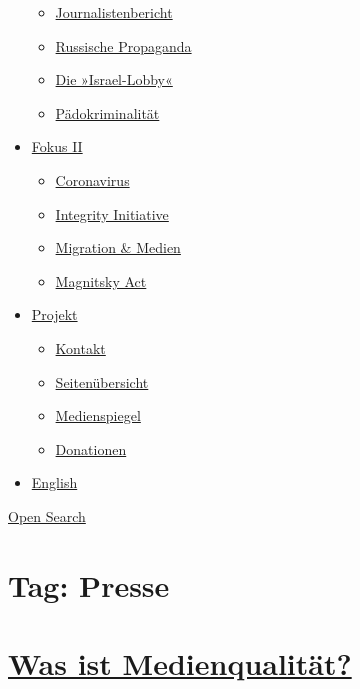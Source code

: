\begin{itemize}
  \begin{itemize}
  \tightlist
  \item
    \href{https://swprs.org/bericht-eines-journalisten/}{Journalistenbericht}
  \item
    \href{https://swprs.org/russische-propaganda/}{Russische Propaganda}
  \item
    \href{https://swprs.org/die-israel-lobby-fakten-und-mythen/}{Die
    »Israel-Lobby«}
  \item
    \href{https://swprs.org/geopolitik-und-paedokriminalitaet/}{Pädokriminalität}
  \end{itemize}
\item
  \href{https://swprs.org/migration-und-medien/}{Fokus II}

  \begin{itemize}
  \tightlist
  \item
    \href{https://swprs.org/covid-19-hinweis-ii/}{Coronavirus}
  \item
    \href{https://swprs.org/die-integrity-initiative/}{Integrity
    Initiative}
  \item
    \href{https://swprs.org/migration-und-medien/}{Migration \& Medien}
  \item
    \href{https://swprs.org/der-fall-magnitsky/}{Magnitsky Act}
  \end{itemize}
\item
  \href{https://swprs.org/kontakt/}{Projekt}

  \begin{itemize}
  \tightlist
  \item
    \href{https://swprs.org/kontakt/}{Kontakt}
  \item
    \href{https://swprs.org/uebersicht/}{Seitenübersicht}
  \item
    \href{https://swprs.org/medienspiegel/}{Medienspiegel}
  \item
    \href{https://swprs.org/donationen/}{Donationen}
  \end{itemize}
\item
  \href{https://swprs.org/contact/}{English}
\end{itemize}

\protect\hyperlink{}{Open Search}

\hypertarget{tag-presse}{%
\section{Tag: Presse}\label{tag-presse}}

\hypertarget{was-ist-medienqualituxe4t}{%
\section{\texorpdfstring{\href{https://swprs.org/2017/03/01/medienqualitaet/}{Was
ist
Medienqualität?}}{Was ist Medienqualität?}}\label{was-ist-medienqualituxe4t}}

